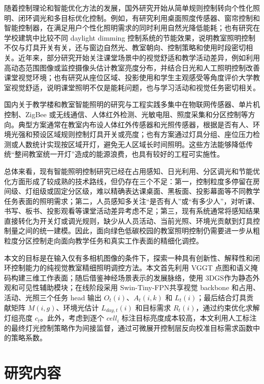 \documentclass[UTF8,a4paper,zihao=-4]{ctexart}
\begin{document}
随着控制理论和智能优化方法的发展，国外研究开始从简单规则控制转向个性化照明、闭环调光和多目标优化控制。例如，有研究利用桌面照度传感器、窗帘控制和智能控制器，在满足用户个性化照明需求的同时利用自然光降低能耗；也有研究在学校建筑中比较不同 daylight dimming 控制系统的节能效果，说明教室照明控制不仅与灯具开关有关，还与窗边自然光、教室朝向、控制策略和使用时段密切相关。近年来，部分研究开始关注课堂场景中的视觉舒适和教学活动差异，例如利用高动态范围图像或监控摄像头估计教室亮度分布，并结合日光和人工照明控制改善课堂视觉环境\cite{budhiyanto2024visual}；也有研究从座位区域、投影使用和学生主观感受等角度评价大学教室视觉舒适\cite{chiou2020visual}，说明课堂照明不仅是能耗问题，也与学习活动和视觉任务密切相关。

国内关于教学楼和教室智能照明的研究与工程实践多集中在物联网传感器、单片机控制、ZigBee 或无线通信、人体红外检测、光敏电阻、照度采集和分区控制等方向。典型方案通常在教室内布设人体红外传感器和光照传感器，根据是否有人、环境光强和预设区域规则控制灯具开关或亮度；也有方案通过灯具分组、座位压力检测或人数统计实现按区域开灯，避免无人区域长时间照明。这些方法能够降低传统“整间教室统一开灯”造成的能源浪费，也具有较好的工程可实施性。

总体来看，现有智能照明控制研究已经在占用感知、日光利用、分区调光和节能优化方面形成了较成熟的技术路线，但仍存在三个不足：第一，控制粒度多停留在房间级、灯组级或固定分区级，难以精确表达课桌面、黑板面、投影幕面等不同教学任务表面的照明需求；第二，人员感知多关注“是否有人”或“有多少人”，对听课、书写、板书、投影观看等课堂活动差异考虑不足；第三，现有系统通常将感知结果直接转化为开关灯或调光规则，缺少从人员活动、当前光照、环境光贡献到灯具控制量之间的统一建模。因此，面向绿色低碳校园的教室照明控制仍需要进一步从粗粒度分区控制走向面向教学任务和真实工作表面的精细化调控。

本文的目标是在输入仅有多相机图像的条件下，探索一种具有创新性、解释性和闭环控制能力的纯视觉教室精细照明调控方法。本文首先利用 VGGT 点图\cite{wang2025vggt}和语义掩码构建三维工作表面；随后借鉴神经场景表示的发展脉络\cite{mildenhall2020nerf}，使用 3DGS\cite{kerbl2023gaussian}作为静态外观和可见性辅助模块；在线阶段采用 Swin-Tiny-FPN\cite{liu2021swin,lin2017fpn}共享视觉 backbone 和占用、活动、光照三个任务 head 输出 $O_t(i)$、$A_t(i,k)$ 和 $L_t(i)$；最后结合灯具贡献矩阵 $M(i,g)$、环境光估计 $L_{day,t}(i)$ 和目标需求 $R_t(i)$，通过约束优化求解灯组亮度 $c_t$。此外，考虑到逐个 $cell_i$ 标注目标亮度成本较高，本文利用人工标注的最终灯光控制策略作为间接监督，通过可微展开控制层\cite{amos2017optnet}反向校准目标需求函数中的策略系数。

\section{研究内容}
\end{document}
